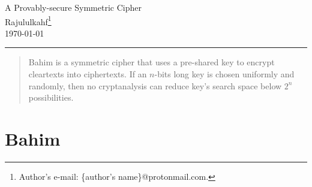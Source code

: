\documentclass[twocolumn]{article}
\begin{document}
\noindent
{}\xrfill[1ex]{0.3em}
\begin{center}
\Large
A Provably-secure Symmetric Cipher\\
\vspace{0.5em}
\normalsize
Rajululkahf\footnote{Author's e-mail: \{author's name\}@protonmail.com.}\\
\footnotesize
\vspace{0.5em}
\today\\
\end{center}
\hrule height 0.3em

\begin{abstract}
    Bahim is a symmetric cipher that uses a pre-shared key to encrypt
    cleartexts into ciphertexts.  If an $n$-bits long key is chosen
    uniformly and randomly, then no cryptanalysis can reduce key's search
    space below $2^n$ possibilities.
\end{abstract}

\section{Bahim}
\end{document}
